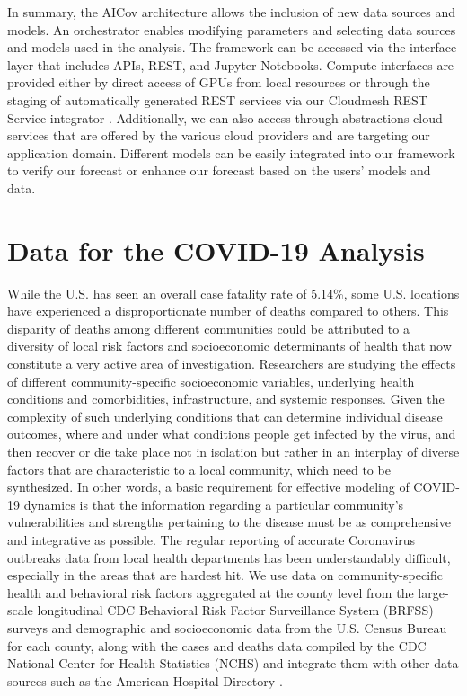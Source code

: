 \documentclass[letterpaper, inpress]{jds} %
\renewcommand{\_}{%
    \textunderscore\hspace{0pt}%
}
\begin{document}
In summary, the AICov architecture allows the inclusion of new data
sources and models. An orchestrator enables modifying parameters and
selecting data sources and models used in the analysis. The framework
can be accessed via the interface layer that includes APIs, REST, and
Jupyter Notebooks. Compute interfaces are provided either by direct
access of GPUs from local resources or through the staging of
automatically generated REST services via our Cloudmesh REST Service
integrator
\citep{cloudmesh-openapi-install,cloudmesh-openapi-benchmark,cloudmesh-manual}.
Additionally, we can also access through abstractions cloud services
that are offered by the various cloud providers and are targeting our
application domain. Different models can be easily integrated into our
framework to verify our forecast or enhance our forecast based on the
users' models and data.

\section{Data for the COVID-19 Analysis}
\label{sec:data}


While the U.S. has seen an overall case fatality rate of 5.14\%, some
U.S. locations have experienced a disproportionate number of deaths
compared to others. This disparity of deaths among different
communities could be attributed to a diversity of local risk factors
and socioeconomic determinants of health that now constitute a very
active area of investigation. Researchers are studying the effects of
different community-specific socioeconomic variables, underlying
health conditions and comorbidities, infrastructure, and systemic
responses.  Given the complexity of such underlying conditions that
can determine individual disease outcomes, where and under what
conditions people get infected by the virus, and then recover or die
take place not in isolation but rather in an interplay of diverse
factors that are characteristic to a local community, which need to be
synthesized. In other words, a basic requirement for effective
modeling of COVID-19 dynamics is that the information regarding a
particular community’s vulnerabilities and strengths pertaining to the
disease must be as comprehensive and integrative as possible.  The
regular reporting of accurate Coronavirus outbreaks data from local
health departments has been understandably difficult, especially in
the areas that are hardest hit.
%
 We use data on community-specific health and
behavioral risk factors aggregated at the county level from the
large-scale longitudinal CDC Behavioral Risk Factor Surveillance
System (BRFSS) surveys \citep{www-cdc-brfss} and demographic and
socioeconomic data from the U.S. Census Bureau \cite{www-sensus} for each county, along with the cases and
deaths data compiled by the CDC National Center for Health Statistics
(NCHS) \citep{www-cdc-nchs} and integrate them with other data
sources such as the American Hospital Directory \citep{www-ahd}.
\end{document}
